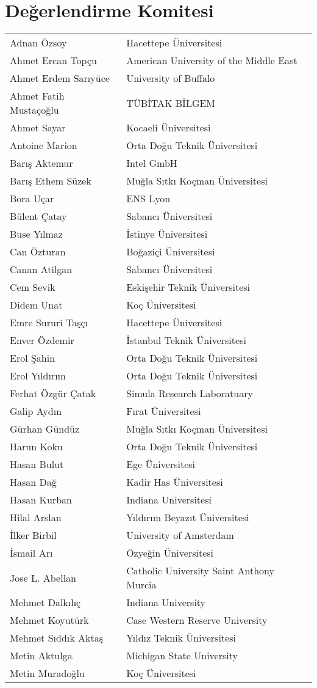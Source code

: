 \section{Değerlendirme Komitesi}
\begin{tabular}{ll}
Adnan Özsoy & Hacettepe Üniversitesi \\
Ahmet Ercan Topçu & American University of the Middle East \\
Ahmet Erdem Sarıyüce & University of Buffalo \\
Ahmet Fatih Mustaçoğlu & TÜBİTAK BİLGEM \\
Ahmet Sayar & Kocaeli Üniversitesi  \\
Antoine Marion & Orta Doğu Teknik Üniversitesi \\
Barış Aktemur & Intel GmbH \\
Barış Ethem Süzek & Muğla Sıtkı Koçman Üniversitesi \\
Bora Uçar & ENS Lyon \\
Bülent Çatay & Sabancı Üniversitesi \\
Buse Yılmaz & İstinye Üniversitesi \\
Can Özturan & Boğaziçi Üniversitesi \\
Canan Atilgan & Sabancı Üniversitesi \\
Cem Sevik & Eskişehir Teknik Üniversitesi \\
Didem Unat & Koç Üniversitesi \\
Emre Sururi Taşçı & Hacettepe Üniversitesi \\
Enver Özdemir & İstanbul Teknik Üniversitesi \\
Erol Şahin & Orta Doğu Teknik Üniversitesi \\
Erol Yıldırım & Orta Doğu Teknik Üniversitesi \\
Ferhat Özgür Çatak & Simula Research Laboratuary \\
Galip Aydın & Fırat Üniversitesi \\
Gürhan Gündüz & Muğla Sıtkı Koçman Üniversitesi \\
Harun Koku & Orta Doğu Teknik Üniversitesi \\
Hasan Bulut & Ege Üniversitesi \\
Hasan Dağ & Kadir Has Üniversitesi \\
Hasan Kurban & Indiana Universitesi \\
Hilal Arslan & Yıldırım Beyazıt Üniversitesi \\
İlker Birbil & University of Amsterdam \\
İsmail Arı & Özyeğin Üniversitesi \\
Jose L. Abellan & Catholic University Saint Anthony Murcia \\
Mehmet Dalkılıç & Indiana University \\
Mehmet Koyutürk & Case Western Reserve University \\
Mehmet Sıddık Aktaş & Yıldız Teknik Üniversitesi \\
Metin Aktulga & Michigan State University \\
Metin Muradoğlu & Koç Üniversitesi \\
\end{tabular}

